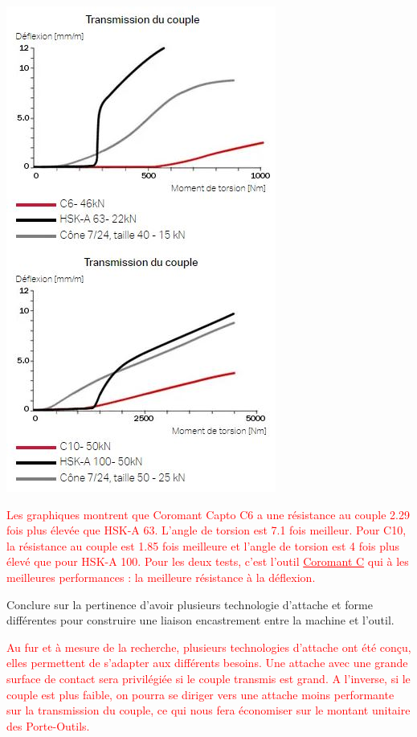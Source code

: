 \documentclass[12pt,a4paper]{article} %
\begin{document}
\begin{minipage}{.55\linewidth}
\includegraphics[scale=0.8]{T1.JPG}
\end{minipage}
\begin{minipage}{.44\linewidth}
\textcolor{red}{Les graphiques montrent que Coromant Capto C6 a une résistance au couple 2.29 fois plus élevée que HSK-A 63. L'angle de torsion est 7.1 fois meilleur. Pour C10, la résistance au couple est 1.85 fois meilleure et l'angle de torsion est 4 fois plus élevé que pour HSK-A 100. Pour les deux tests, c'est l'outil \underline{Coromant C} qui à les meilleures performances : la meilleure résistance à la déflexion.}
\end{minipage}


\newpage


\begin{exo} Conclure sur la pertinence d'avoir plusieurs technologie d'attache et forme différentes pour construire une liaison encastrement entre la machine et l'outil.
\end{exo}
\marginnote{1 pt}
\textcolor{red}{Au fur et à mesure de la recherche, plusieurs technologies d'attache ont été conçu, elles permettent de s'adapter aux différents besoins. Une attache avec une grande surface de contact sera privilégiée si le couple transmis est grand. A l'inverse, si le couple est plus faible, on pourra se diriger vers une attache moins performante sur la transmission du couple, ce qui nous fera économiser sur le montant unitaire des Porte-Outils.}
\end{document}
